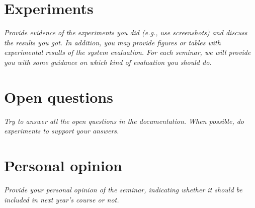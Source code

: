 \documentclass[a4paper, 10pt]{article}
\begin{document}
\section{Experiments}

\textit{Provide evidence of the experiments you did (e.g., use screenshots) and discuss the results you got. In addition, you may provide figures or tables with experimental results of the system evaluation. For each seminar, we will provide you with some guidance on which kind of evaluation you should do.}

\section{Open questions}

\textit{Try to answer all the open questions in the documentation. When possible, do experiments to support your answers.}

\section{Personal opinion}

\textit{Provide your personal opinion of the seminar, indicating whether it should be included in next year's course or not.}
\end{document}
